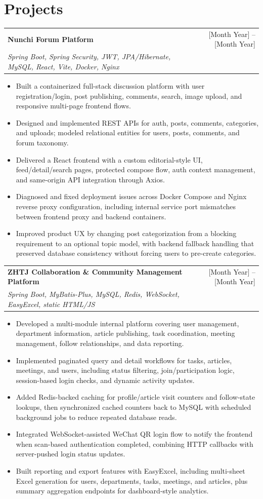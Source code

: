 \documentclass[11pt]{article}
\newcommand{\resumeProject}[3]{
  \begin{tabularx}{\textwidth}{Xr}
    \textbf{#1} & #2 \\
    \textit{#3} & \\
  \end{tabularx}
}
\begin{document}
\section*{Projects}
\resumeProject
  {Nunchi Forum Platform}{[Month Year] -- [Month Year]}
  {Spring Boot, Spring Security, JWT, JPA/Hibernate, MySQL, React, Vite, Docker, Nginx}
\begin{itemize}
  \item Built a containerized full-stack discussion platform with user registration/login, post publishing, comments, search, image upload, and responsive multi-page frontend flows.
  \item Designed and implemented REST APIs for auth, posts, comments, categories, and uploads; modeled relational entities for users, posts, comments, and forum taxonomy.
  \item Delivered a React frontend with a custom editorial-style UI, feed/detail/search pages, protected compose flow, auth context management, and same-origin API integration through Axios.
  \item Diagnosed and fixed deployment issues across Docker Compose and Nginx reverse proxy configuration, including internal service port mismatches between frontend proxy and backend containers.
  \item Improved product UX by changing post categorization from a blocking requirement to an optional topic model, with backend fallback handling that preserved database consistency without forcing users to pre-create categories.
\end{itemize}

\resumeProject
  {ZHTJ Collaboration \& Community Management Platform}{[Month Year] -- [Month Year]}
  {Spring Boot, MyBatis-Plus, MySQL, Redis, WebSocket, EasyExcel, static HTML/JS}
\begin{itemize}
  \item Developed a multi-module internal platform covering user management, department information, article publishing, task coordination, meeting management, follow relationships, and data reporting.
  \item Implemented paginated query and detail workflows for tasks, articles, meetings, and users, including status filtering, join/participation logic, session-based login checks, and dynamic activity updates.
  \item Added Redis-backed caching for profile/article visit counters and follow-state lookups, then synchronized cached counters back to MySQL with scheduled background jobs to reduce repeated database reads.
  \item Integrated WebSocket-assisted WeChat QR login flow to notify the frontend when scan-based authentication completed, combining HTTP callbacks with server-pushed login status updates.
  \item Built reporting and export features with EasyExcel, including multi-sheet Excel generation for users, departments, tasks, meetings, and articles, plus summary aggregation endpoints for dashboard-style analytics.
\end{itemize}
\end{document}
